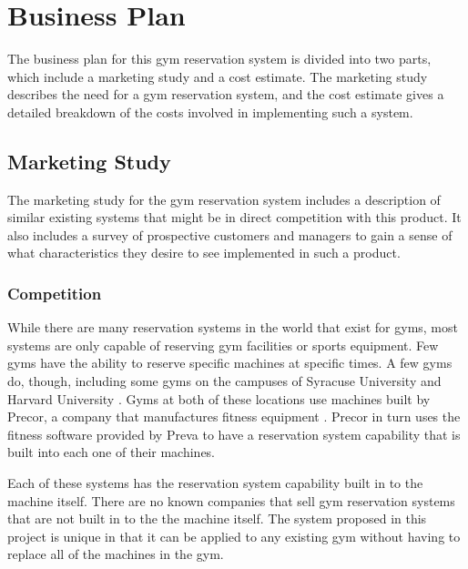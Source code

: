\documentclass[PPFS.tex]{template/subfiles}
\begin{document}
\section{Business Plan}

The business plan for this gym reservation system is divided into two parts, which include a marketing study and a cost estimate. The marketing study describes the need for a gym reservation system, and the cost estimate gives a detailed breakdown of the costs involved in implementing such a system.

    \subsection{Marketing Study}
    
    The marketing study for the gym reservation system includes a description of similar existing systems that might be in direct competition with this product. It also includes a survey of prospective customers and managers to gain a sense of what characteristics they desire to see implemented in such a product.
    
        \subsubsection{Competition}
        
        While there are many reservation systems in the world that exist for gyms, most systems are only capable of reserving gym facilities or sports equipment. Few gyms have the ability to reserve specific machines at specific times. A few gyms do, though, including some gyms on the campuses of Syracuse University \cite{Syracuse} and Harvard University \cite{Harvard}. Gyms at both of these locations use machines built by Precor, a company that manufactures fitness equipment \cite{Precor}. Precor in turn uses the fitness software provided by Preva \cite{Preva} to have a reservation system capability that is built into each one of their machines.
        
        Each of these systems has the reservation system capability built in to the machine itself. There are no known companies that sell gym reservation systems that are not built in to the the machine itself. The system proposed in this project is unique in that it can be applied to any existing gym without having to replace all of the machines in the gym.
        
\end{document}
